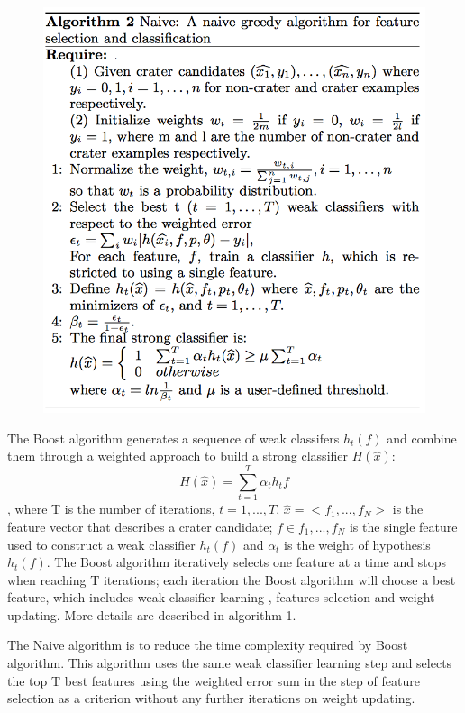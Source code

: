 \documentclass[conference]{IEEEtran}
\begin{document}
\begin{figure}[!htb]
\begin{center}
\includegraphics[scale=0.34]{naive.png}
\label{default}
\end{center}
\end{figure}
The Boost algorithm generates a sequence of weak classifers $h_t(f)$ and combine them through a weighted approach to build a strong classifier $H(\hat{x})$:
\begin{equation}
 H(\hat{x}) = \sum_{t=1}^{T}\alpha_th_t{f}
\end{equation},
where T is the number of iterations, $t = 1,...,T$, $\hat{x} = <f_1,...,f_N>$ is the feature vector that describes a crater candidate; $f \in {f_1,...,f_N}$ is the single feature used to construct a weak classifier $h_t(f)$ and $\alpha_t$ is the weight of hypothesis $h_t(f)$. The Boost algorithm iteratively selects one feature at a time and stops when reaching T iterations; each iteration the Boost algorithm will choose a best feature, which includes weak classifier learning , features selection and weight updating. More details are described in algorithm 1.


The Naive algorithm is to reduce the time complexity required by Boost algorithm. This algorithm uses the same weak classifier learning step and selects the top T best features using the weighted error sum in the step of feature selection as a criterion without any further iterations on weight updating.
\end{document}
